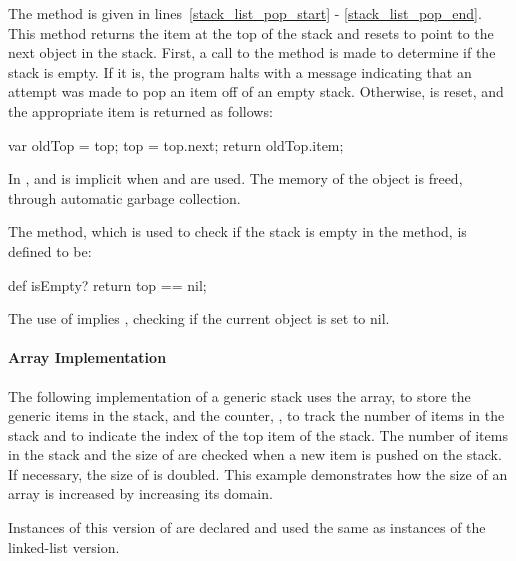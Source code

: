 The  method is given in lines~\ref{stack_list_pop_start} -
\ref{stack_list_pop_end}.  This method returns the item at the top of
the stack and resets  to point to the next object in the stack.
First, a call to the  method  is made to 
determine if the stack is
empty.  If it is, the program halts with a message indicating that 
an attempt was made to pop an item off of an empty stack.  Otherwise,
 is reset, and the appropriate item is returned as follows:
\begin{chapel}
    var oldTop = top;              
    top = top.next;               
    return oldTop.item;          
\end{chapel}
In ,  and  is implicit when
 and  are used.
The memory of the  object is freed, through automatic
garbage collection.

The  method, which is used to check if the stack
is empty in the  method, is defined to be:
\begin{chapel}
  def isEmpty? return top == nil;   
\end{chapel}
The use of  implies , checking if the
current  object is set to nil.

\paragraph{Array Implementation}
The following implementation of a generic stack uses the array,
 to store the generic items in the stack, and the
counter, , to track the
number of items in the stack and to indicate the index of
the top item of the stack.  The number of items in the stack
and the size of  are checked when a new item is pushed
on the stack.  If necessary, the size of  is doubled.
This example demonstrates how the size of an array is increased 
by increasing its domain.

Instances of this version of  are declared and
used the same as instances of the linked-list version.

